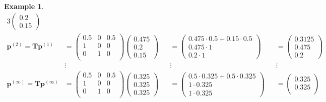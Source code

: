 \documentclass[a4paper, 12pt]{report}
\newtheorem{example}{Example}
\newcommand{\T}{\bm{T}}
\begin{document}
\begin{example}
\begin{alignat*}{3}
\begin{pmatrix}
            0.2 \\
            0.15
        \end{pmatrix} \\
        \bm{p}^{(2)} = \T\bm{p}^{(1)} &= 
        \begin{pmatrix}
            0.5 & 0 & 0.5 \\
            1 & 0 & 0 \\
            0 & 1 & 0 \\
        \end{pmatrix}
        \begin{pmatrix}
            0.475 \\
            0.2 \\
            0.15
        \end{pmatrix} &&= 
        \begin{pmatrix}
            0.475 \cdot 0.5 + 0.15 \cdot 0.5 \\
            0.475 \cdot 1 \\
            0.2 \cdot 1
        \end{pmatrix} &&= 
        \begin{pmatrix}
            0.3125 \\
            0.475 \\
            0.2
        \end{pmatrix} \\
        &\vdots &&\vdots &&\vdots \\
        \bm{p}^{(\infty)} = \T\bm{p}^{(\infty)} &= \begin{pmatrix}
            0.5 & 0 & 0.5 \\
            1 & 0 & 0 \\
            0 & 1 & 0 \\
        \end{pmatrix}
        \begin{pmatrix}
            0.325 \\
            0.325 \\
            0.325
        \end{pmatrix} &&= 
        \begin{pmatrix}
            0.5 \cdot 0.325 + 0.5 \cdot 0.325 \\
            1 \cdot 0.325 \\
            1 \cdot 0.325
        \end{pmatrix} &&=
        \begin{pmatrix}
            0.325 \\
            0.325 \\

\end{pmatrix}
\end{alignat*}
\end{example}
\end{document}
